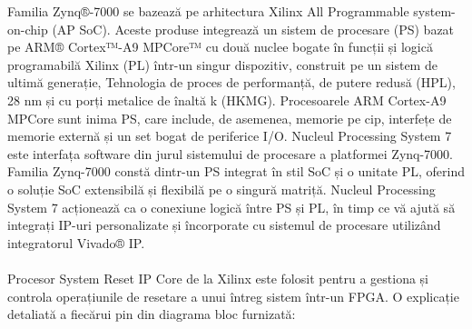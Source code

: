 \documentclass[12pt]{article}
\begin{document}
\hspace*{1cm}Familia Zynq®-7000 se bazează pe arhitectura Xilinx All Programmable system-on-chip (AP SoC). Aceste produse integrează un sistem de procesare (PS) bazat pe ARM® Cortex™-A9 MPCore™ cu două nuclee bogate în funcții și logică programabilă Xilinx (PL) într-un singur dispozitiv, construit pe un sistem de ultimă generație, Tehnologia de proces de performanță, de putere redusă (HPL), 28 nm și cu porți metalice de înaltă k (HKMG). Procesoarele ARM Cortex-A9 MPCore sunt inima PS, care include, de asemenea, memorie pe cip, interfețe de memorie externă și un set bogat de periferice I/O. Nucleul Processing System 7 este interfața software din jurul sistemului de procesare a platformei Zynq-7000. Familia Zynq-7000 constă dintr-un PS integrat în stil SoC și o unitate PL, oferind o soluție SoC extensibilă și flexibilă pe o singură matriță. Nucleul Processing System 7 acționează ca o conexiune logică între PS și PL, în timp ce vă ajută să integrați IP-uri personalizate și încorporate cu sistemul de procesare utilizând integratorul Vivado® IP.\\\\
\hspace*{1cm}Procesor System Reset IP Core de la Xilinx este folosit pentru a gestiona și controla operațiunile de resetare a unui întreg sistem într-un FPGA. O explicație detaliată a fiecărui pin din diagrama bloc furnizată:
\end{document}
